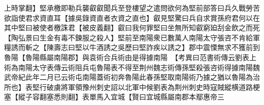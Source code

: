 上時掌翻】堅承檄即勒兵襲叡叡聞兵至登樓望之遣問欲何為堅前部答曰兵久戰勞苦欲詣使君求資直耳【據吳錄資直者衣資之直也】叡見堅驚曰兵自求賞孫府君何以在其中堅曰被使者檄誅君【被皮義翻】叡曰我何罪堅曰坐無所知叡窮廹刮金飲之而死【陶弘景曰生金有毒不鍊服之殺人】堅前至南陽衆已數萬人南陽太守張咨不肯給軍糧誘而斬之【陳壽志曰堅以牛酒誘之吳歷曰堅詐疾以誘之】郡中震慄無求不獲前到魯陽【魯陽縣屬南陽郡】與袁術合兵術由是得據南陽　【考異曰范書術傳云劉表上術為南陽太守表傳云術阻兵屯魯陽表不得至荆州魏志術傳孫堅殺張咨術得據南陽魏武帝紀此年二月已云術屯南陽蓋術初奔魯陽此春孫堅取南陽術乃據之猶以魯陽為治所也】表堅行破虜將軍領豫州刺史詔以北軍中候劉表為荆州刺史時寇賊縱横道路梗塞【縱子容翻塞悉則翻】表單馬入宜城【賢曰宜城縣屬南郡本鄢惠帝三